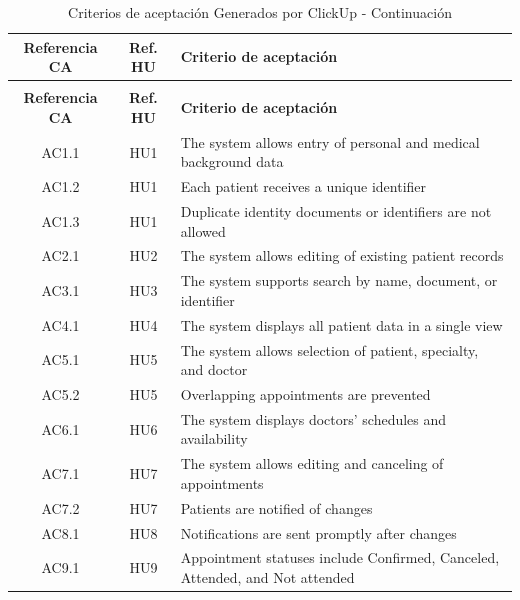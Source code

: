 \begin{longtable}{|c|c|p{9cm}|}
\caption{Criterios de aceptación Generados por ClickUp} 
\label{tab:criterios_clickup} \\
\hline
\textbf{Referencia CA} & \textbf{Ref. HU} & \textbf{Criterio de aceptación} \\
\hline
\endfirsthead

\caption{Criterios de aceptación Generados por ClickUp - Continuación} \\
\hline
\textbf{Referencia CA} & \textbf{Ref. HU} & \textbf{Criterio de aceptación} \\
\hline
\endhead

\hline
\endfoot

\hline
\endlastfoot

AC1.1 & HU1 & The system allows entry of personal and medical background data \\
\hline
AC1.2 & HU1 & Each patient receives a unique identifier \\
\hline
AC1.3 & HU1 & Duplicate identity documents or identifiers are not allowed \\
\hline

AC2.1 & HU2 & The system allows editing of existing patient records \\
\hline

AC3.1 & HU3 & The system supports search by name, document, or identifier \\
\hline

AC4.1 & HU4 & The system displays all patient data in a single view \\
\hline

AC5.1 & HU5 & The system allows selection of patient, specialty, and doctor \\
\hline
AC5.2 & HU5 & Overlapping appointments are prevented \\
\hline

AC6.1 & HU6 & The system displays doctors’ schedules and availability \\
\hline

AC7.1 & HU7 & The system allows editing and canceling of appointments \\
\hline
AC7.2 & HU7 & Patients are notified of changes \\
\hline

AC8.1 & HU8 & Notifications are sent promptly after changes \\
\hline

AC9.1 & HU9 & Appointment statuses include Confirmed, Canceled, Attended, and Not attended \\
\hline


\end{longtable}
